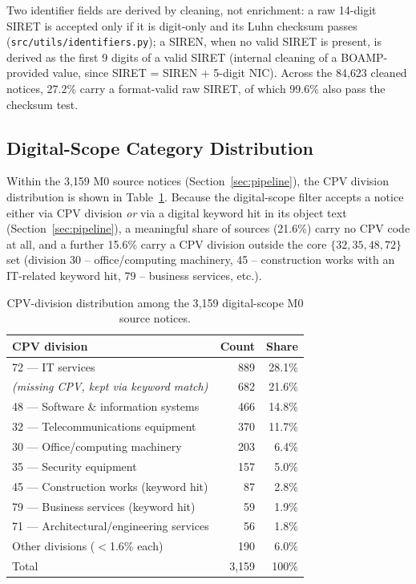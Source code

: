 \documentclass[11pt]{article}
\begin{document}
Two identifier fields are derived by cleaning, not enrichment: a raw
14-digit SIRET is accepted only if it is digit-only and its Luhn checksum
passes (\texttt{src/utils/identifiers.py}); a SIREN, when no valid SIRET is
present, is derived as the first 9 digits of a valid SIRET (internal
cleaning of a BOAMP-provided value, since SIRET = SIREN + 5-digit NIC).
Across the 84{,}623 cleaned notices, 27.2\% carry a format-valid raw SIRET,
of which 99.6\% also pass the checksum test.

\subsection{Digital-Scope Category Distribution}
Within the 3{,}159 M0 source notices (Section~\ref{sec:pipeline}), the CPV
division distribution is shown in Table~\ref{tab:cpvdiv}. Because the
digital-scope filter accepts a notice either via CPV division \emph{or} via
a digital keyword hit in its object text (Section~\ref{sec:pipeline}), a
meaningful share of sources (21.6\%) carry no CPV code at all, and a further
15.6\% carry a CPV division outside the core $\{32,35,48,72\}$ set (division
30 -- office/computing machinery, 45 -- construction works with an
IT-related keyword hit, 79 -- business services, etc.).

\begin{table}[h!]
\centering
\caption{CPV-division distribution among the 3{,}159 digital-scope M0 source notices.}
\label{tab:cpvdiv}
\begin{tabular}{lrr}
\toprule
CPV division & Count & Share \\
\midrule
72 --- IT services & 889 & 28.1\% \\
\emph{(missing CPV, kept via keyword match)} & 682 & 21.6\% \\
48 --- Software \& information systems & 466 & 14.8\% \\
32 --- Telecommunications equipment & 370 & 11.7\% \\
30 --- Office/computing machinery & 203 & 6.4\% \\
35 --- Security equipment & 157 & 5.0\% \\
45 --- Construction works (keyword hit) & 87 & 2.8\% \\
79 --- Business services (keyword hit) & 59 & 1.9\% \\
71 --- Architectural/engineering services & 56 & 1.8\% \\
Other divisions ($<$1.6\% each) & 190 & 6.0\% \\
\midrule
Total & 3{,}159 & 100\% \\
\bottomrule
\end{tabular}
\end{table}
\end{document}
